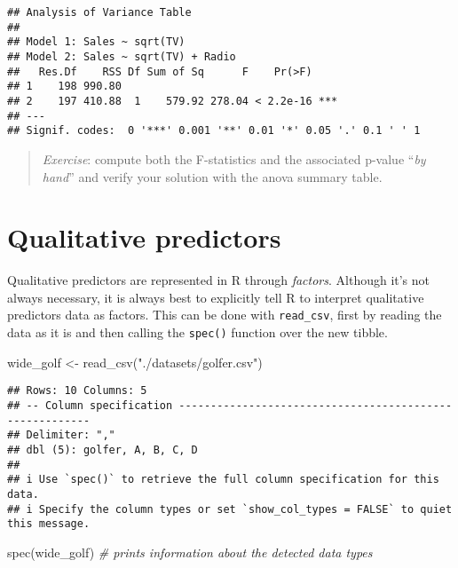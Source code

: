 \documentclass[
  oneside]{book}
\newenvironment{Shaded}{\begin{snugshade}}{\end{snugshade}}
\newcommand{\CommentTok}[1]{\textcolor[rgb]{0.56,0.35,0.01}{\textit{#1}}}
\newcommand{\FunctionTok}[1]{\textcolor[rgb]{0.00,0.00,0.00}{#1}}
\newcommand{\NormalTok}[1]{#1}
\newcommand{\OtherTok}[1]{\textcolor[rgb]{0.56,0.35,0.01}{#1}}
\newcommand{\StringTok}[1]{\textcolor[rgb]{0.31,0.60,0.02}{#1}}
\begin{document}
\begin{verbatim}
## Analysis of Variance Table
## 
## Model 1: Sales ~ sqrt(TV)
## Model 2: Sales ~ sqrt(TV) + Radio
##   Res.Df    RSS Df Sum of Sq      F    Pr(>F)    
## 1    198 990.80                                  
## 2    197 410.88  1    579.92 278.04 < 2.2e-16 ***
## ---
## Signif. codes:  0 '***' 0.001 '**' 0.01 '*' 0.05 '.' 0.1 ' ' 1
\end{verbatim}

\begin{quote}
\emph{Exercise}: compute both the F-statistics and the associated p-value
``\emph{by hand}'' and verify your solution with the anova summary table.
\end{quote}

\hypertarget{qualitative-predictors}{%
\section{Qualitative predictors}\label{qualitative-predictors}}

Qualitative predictors are represented in R through \emph{factors}.
Although it's not always necessary, it is always best to
explicitly tell R to interpret qualitative predictors data as factors.
This can be done with \texttt{read\_csv}, first by reading the data as it is
and then calling the \texttt{spec()} function over the new tibble.

\begin{Shaded}
\begin{Highlighting}[]
\NormalTok{wide\_golf }\OtherTok{\textless{}{-}} \FunctionTok{read\_csv}\NormalTok{(}\StringTok{"./datasets/golfer.csv"}\NormalTok{)}
\end{Highlighting}
\end{Shaded}

\begin{verbatim}
## Rows: 10 Columns: 5
## -- Column specification --------------------------------------------------------
## Delimiter: ","
## dbl (5): golfer, A, B, C, D
## 
## i Use `spec()` to retrieve the full column specification for this data.
## i Specify the column types or set `show_col_types = FALSE` to quiet this message.
\end{verbatim}

\begin{Shaded}
\begin{Highlighting}[]
\FunctionTok{spec}\NormalTok{(wide\_golf) }\CommentTok{\# prints information about the detected data types}
\end{Highlighting}
\end{Shaded}
\end{document}
